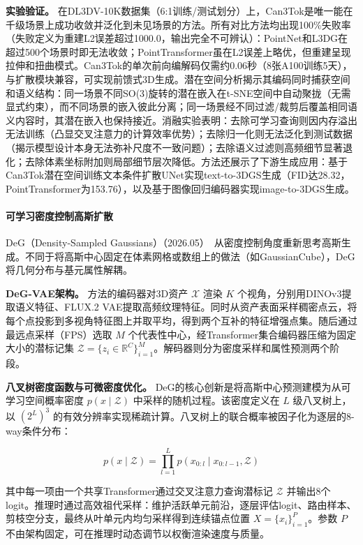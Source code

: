 \textbf{实验验证。}
在DL3DV-10K数据集（6:1训练/测试划分）上，Can3Tok是唯一能在千级场景上成功收敛并泛化到未见场景的方法。所有对比方法均出现100\%失败率（失败定义为重建L2误差超过1000.0，输出完全不可辨认）：PointNet和L3DG在超过500个场景时即无法收敛；PointTransformer虽在L2误差上略优，但重建呈现拉伸和扭曲模式。Can3Tok的单次前向编解码仅需约0.06秒（8张A100训练5天），与扩散模块兼容，可实现前馈式3D生成。潜在空间分析揭示其编码同时捕获空间和语义结构：同一场景不同SO(3)旋转的潜在嵌入在t-SNE空间中自动聚拢（无需显式约束），而不同场景的嵌入彼此分离；同一场景经不同过滤/裁剪后覆盖相同语义内容时，其潜在嵌入也保持接近。消融实验表明：去除可学习查询则因内存溢出无法训练（凸显交叉注意力的计算效率优势）；去除归一化则无法泛化到测试数据（揭示模型设计本身无法弥补尺度不一致问题）；去除语义过滤则高频细节显著退化；去除体素坐标附加则局部细节层次降低。方法还展示了下游生成应用：基于Can3Tok潜在空间训练文本条件扩散UNet实现text-to-3DGS生成（FID达28.32，PointTransformer为153.76），以及基于图像回归编码器实现image-to-3DGS生成。

\paragraph{可学习密度控制高斯扩散}

DeG（Density-Sampled Gaussians）（2026.05）~\cite{2605_16355}从密度控制角度重新思考高斯生成。不同于将高斯中心固定在体素网格或数组上的做法（如GaussianCube），DeG将几何分布与基元属性解耦。

\textbf{DeG-VAE架构。}
方法的编码器对3D资产 $\mathcal{X}$ 渲染 $K$ 个视角，分别用DINOv3提取语义特征、FLUX.2 VAE提取高频纹理特征。同时从资产表面采样稠密点云，将每个点投影到多视角特征图上并取平均，得到两个互补的特征增强点集。随后通过最远点采样（FPS）选取 $M$ 个代表性中心，经Transformer集合编码器压缩为固定大小的潜标记集 $\mathcal{Z}=\{z_i \in \mathbb{R}^C\}_{i=1}^{M}$。解码器则分为密度采样和属性预测两个阶段。

\textbf{八叉树密度函数与可微密度优化。}
DeG的核心创新是将高斯中心预测建模为从可学习空间概率密度 $p(x \mid \mathcal{Z})$ 中采样的随机过程。该密度定义在 $L$ 级八叉树上，以 $(2^L)^3$ 的有效分辨率实现稀疏计算。八叉树上的联合概率被因子化为逐层的8-way条件分布：

\begin{equation}
p(x \mid \mathcal{Z}) = \prod_{l=1}^{L} p(x_{0:l} \mid x_{0:l-1}, \mathcal{Z})
\end{equation}

其中每一项由一个共享Transformer通过交叉注意力查询潜标记 $\mathcal{Z}$ 并输出8个logit。推理时通过高效祖代采样：维护活跃单元前沿，逐层评估logit、路由样本、剪枝空分支，最终从叶单元内均匀采样得到连续锚点位置 $X = \{x_i\}_{i=1}^{P}$。参数 $P$ 不由架构固定，可在推理时动态调节以权衡渲染速度与质量。

